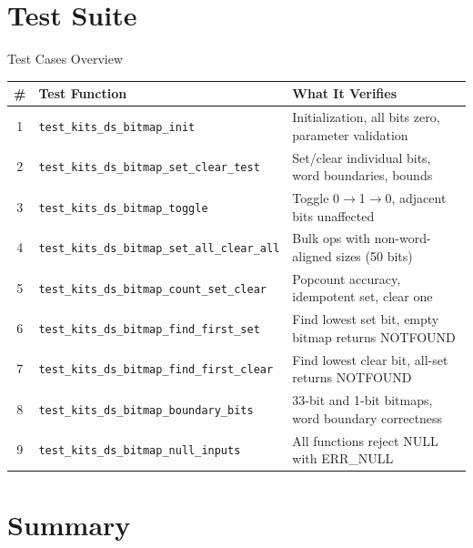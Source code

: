 \documentclass[aspectratio=169, 10pt]{beamer}
\begin{document}
\section{Test Suite}

\begin{frame}{Test Cases Overview}
\begin{table}
\centering
\small
\begin{tabular}{@{}clp{7cm}@{}}
\toprule
\textbf{\#} & \textbf{Test Function} & \textbf{What It Verifies} \\
\midrule
1 & \texttt{test\_kits\_ds\_bitmap\_init}
  & Initialization, all bits zero, parameter validation \\
2 & \texttt{test\_kits\_ds\_bitmap\_set\_clear\_test}
  & Set/clear individual bits, word boundaries, bounds \\
3 & \texttt{test\_kits\_ds\_bitmap\_toggle}
  & Toggle 0$\rightarrow$1$\rightarrow$0, adjacent bits unaffected \\
4 & \texttt{test\_kits\_ds\_bitmap\_set\_all\_clear\_all}
  & Bulk ops with non-word-aligned sizes (50 bits) \\
5 & \texttt{test\_kits\_ds\_bitmap\_count\_set\_clear}
  & Popcount accuracy, idempotent set, clear one \\
6 & \texttt{test\_kits\_ds\_bitmap\_find\_first\_set}
  & Find lowest set bit, empty bitmap returns NOTFOUND \\
7 & \texttt{test\_kits\_ds\_bitmap\_find\_first\_clear}
  & Find lowest clear bit, all-set returns NOTFOUND \\
8 & \texttt{test\_kits\_ds\_bitmap\_boundary\_bits}
  & 33-bit and 1-bit bitmaps, word boundary correctness \\
9 & \texttt{test\_kits\_ds\_bitmap\_null\_inputs}
  & All functions reject NULL with ERR\_NULL \\
\bottomrule
\end{tabular}
\end{table}
\end{frame}

\section{Summary}
\end{document}
